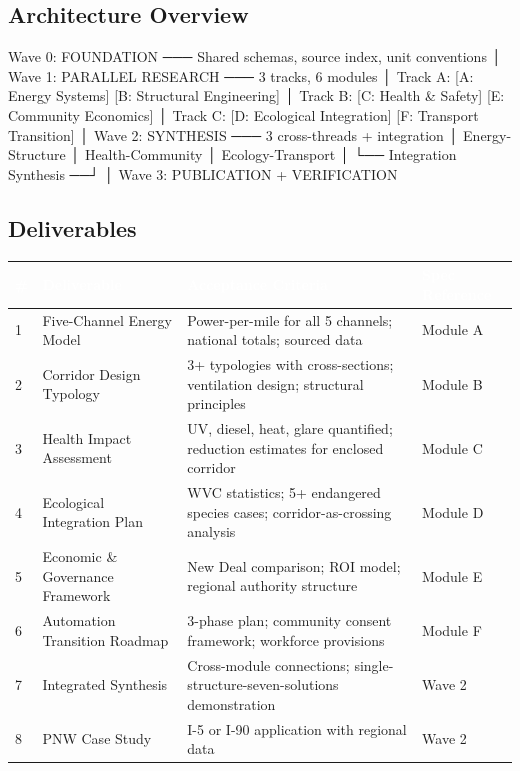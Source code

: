 \documentclass[11pt,letterpaper]{article}
\newcommand{\tableheader}[1]{\textbf{\sffamily\textcolor{white}{#1}}}
\begin{document}
\subsection{Architecture Overview}

\begin{asciibox}
  Wave 0: FOUNDATION ─── Shared schemas, source index, unit conventions
     │
  Wave 1: PARALLEL RESEARCH ─── 3 tracks, 6 modules
     │   Track A: [A: Energy Systems] [B: Structural Engineering]
     │   Track B: [C: Health & Safety] [E: Community Economics]
     │   Track C: [D: Ecological Integration] [F: Transport Transition]
     │
  Wave 2: SYNTHESIS ─── 3 cross-threads + integration
     │   Energy-Structure │ Health-Community │ Ecology-Transport
     │              └── Integration Synthesis ──┘
     │
  Wave 3: PUBLICATION + VERIFICATION
\end{asciibox}

\subsection{Deliverables}

\begin{center}
\begin{tabularx}{\textwidth}{C{0.6cm}L{4cm}L{4cm}X}
\toprule
{}
\tableheader{\#} & \tableheader{Deliverable} & \tableheader{Acceptance Criteria} & \tableheader{Spec Reference} \\
 & Five-Channel Energy Model & Power-per-mile for all 5 channels; national totals; sourced data & Module A \\
2 & Corridor Design Typology & 3+ typologies with cross-sections; ventilation design; structural principles & Module B \\
3 & Health Impact Assessment & UV, diesel, heat, glare quantified; reduction estimates for enclosed corridor & Module C \\
4 & Ecological Integration Plan & WVC statistics; 5+ endangered species cases; corridor-as-crossing analysis & Module D \\
5 & Economic \& Governance Framework & New Deal comparison; ROI model; regional authority structure & Module E \\
6 & Automation Transition Roadmap & 3-phase plan; community consent framework; workforce provisions & Module F \\
7 & Integrated Synthesis & Cross-module connections; single-structure-seven-solutions demonstration & Wave 2 \\
8 & PNW Case Study & I-5 or I-90 application with regional data & Wave 2 \\
\bottomrule
\end{tabularx}
\end{center}
\end{document}
